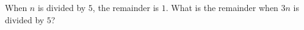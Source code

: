 When $n$ is divided by $5$, the remainder is $1$. What is the remainder when $3n$ is divided by $5$?
